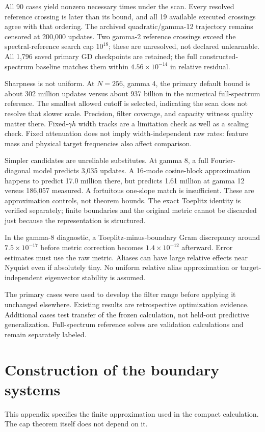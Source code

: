 \documentclass[11pt]{article}
\theoremstyle{definition}
\begin{document}
All 90 cases yield nonzero necessary times under the scan. Every
resolved reference crossing is later than its bound, and all 19 available
executed crossings agree with that ordering. The archived quadratic/gamma-12
trajectory remains censored at 200,000 updates. Two gamma-2 reference
crossings exceed the spectral-reference search cap $10^{18}$; these are
unresolved, not declared unlearnable. All 1,796 saved primary GD checkpoints
are retained; the full constructed-spectrum baseline matches them within
$4.56\times10^{-14}$ in relative residual.

Sharpness is not uniform. At $N=256$, gamma 4, the primary default
bound is about 302 million updates versus about 937 billion in the
numerical full-spectrum reference. The smallest allowed cutoff is
selected, indicating the scan does not resolve that slower scale.
Precision, filter coverage, and capacity witness quality matter there.
Fixed-$\gamma h$ width tracks are a limitation check as well as a scaling
check. Fixed attenuation does not imply width-independent raw rates:
feature mass and physical target frequencies also affect comparison.

Simpler candidates are unreliable substitutes. At gamma 8, a full
Fourier-diagonal model predicts 3,035 updates. A 16-mode cosine-block
approximation happens to predict 17.0 million there, but predicts 1.61
million at gamma 12 versus 186,057 measured. A fortuitous one-slope match
is insufficient. These are approximation controls, not theorem bounds.
The exact Toeplitz identity is verified separately; finite boundaries
and the original metric cannot be discarded just because the
representation is structured.

In the gamma-8 diagnostic, a Toeplitz-minus-boundary Gram discrepancy
around $7.5\times10^{-17}$ before metric correction becomes
$1.4\times10^{-12}$ afterward. Error estimates must use the raw metric.
Aliases can have large relative effects near Nyquist even if absolutely
tiny. No uniform relative alias approximation or target-independent
eigenvector stability is assumed.

The primary cases were used to develop the filter range before applying
it unchanged elsewhere. Existing results are retrospective optimization
evidence. Additional cases test transfer of the frozen calculation,
not held-out predictive generalization. Full-spectrum reference solves
are validation calculations and remain separately labeled.

\appendix
\section{Construction of the boundary systems}
This appendix specifies the finite approximation used in the compact
calculation. The cap theorem itself does not depend on it.
\end{document}
